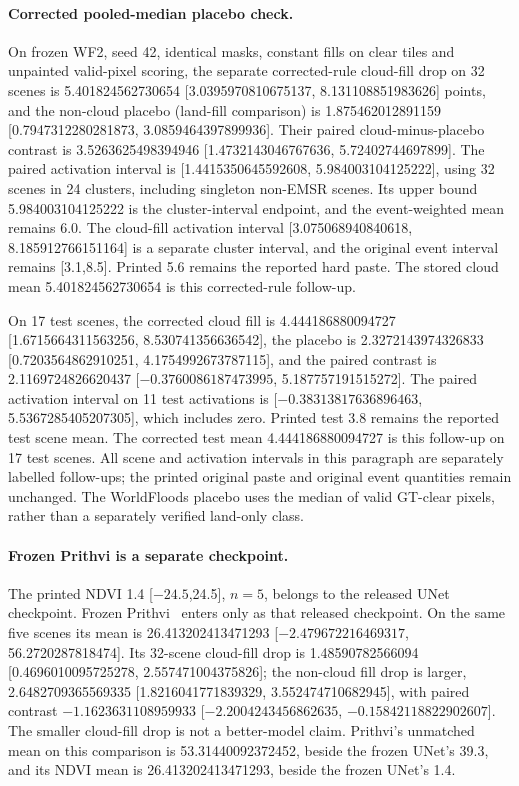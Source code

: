 \paragraph{Corrected pooled-median placebo check.}
On frozen WF2, seed 42, identical masks, constant fills on clear tiles and unpainted valid-pixel scoring, the separate corrected-rule cloud-fill drop on 32 scenes is 5.401824562730654 [3.0395970810675137, 8.131108851983626] points, and the non-cloud placebo (land-fill comparison) is 1.875462012891159 [0.7947312280281873, 3.0859464397899936].
Their paired cloud-minus-placebo contrast is 3.5263625498394946 [1.4732143046767636, 5.72402744697899].
The paired activation interval is [1.4415350645592608, 5.984003104125222], using 32 scenes in 24 clusters, including singleton non-EMSR scenes.
Its upper bound 5.984003104125222 is the cluster-interval endpoint, and the event-weighted mean remains 6.0.
The cloud-fill activation interval [3.075068940840618, 8.185912766151164] is a separate cluster interval, and the original event interval remains [3.1,8.5].
Printed 5.6 remains the reported hard paste.
The stored cloud mean 5.401824562730654 is this corrected-rule follow-up.

On 17 test scenes, the corrected cloud fill is 4.444186880094727 [1.6715664311563256, 8.530741356636542], the placebo is 2.3272143974326833 [0.7203564862910251, 4.1754992673787115], and the paired contrast is 2.1169724826620437 [$-0.3760086187473995$, 5.187757191515272].
The paired activation interval on 11 test activations is [$-0.38313817636896463$, 5.5367285405207305], which includes zero.
Printed test 3.8 remains the reported test scene mean.
The corrected test mean 4.444186880094727 is this follow-up on 17 test scenes.
All scene and activation intervals in this paragraph are separately labelled follow-ups; the printed original paste and original event quantities remain unchanged.
The WorldFloods placebo uses the median of valid GT-clear pixels, rather than a separately verified land-only class.

\paragraph{Frozen Prithvi is a separate checkpoint.}
The printed NDVI 1.4 [$-24.5$,24.5], $n=5$, belongs to the released UNet checkpoint.
Frozen Prithvi~\cite{prithvi} enters only as that released checkpoint.
On the same five scenes its mean is 26.413202413471293 [$-2.479672216469317$, 56.2720287818474].
Its 32-scene cloud-fill drop is 1.48590782566094 [0.4696010095725278, 2.557471004375826]; the non-cloud fill drop is larger, 2.6482709365569335 [1.8216041771839329, 3.552474710682945], with paired contrast $-1.1623631108959933$ [$-2.2004243456862635$, $-0.15842118822902607$].
The smaller cloud-fill drop is not a better-model claim.
Prithvi's unmatched mean on this comparison is 53.31440092372452, beside the frozen UNet's 39.3, and its NDVI mean is 26.413202413471293, beside the frozen UNet's 1.4.

